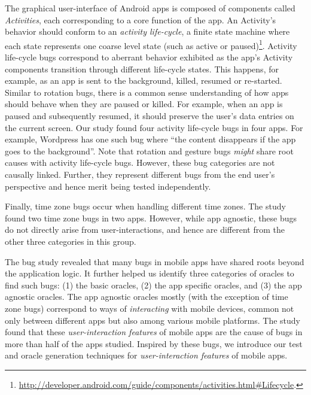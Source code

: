 The graphical user-interface of Android apps is composed of components called \textit{Activities}, each corresponding to a core function of the app. An Activity's behavior should conform to an \textit{activity life-cycle}, a finite state machine where each state represents one coarse level state (such as active or paused)\footnote{\url{http://developer.android.com/guide/components/activities.html#Lifecycle}.}. 
Activity life-cycle bugs correspond to aberrant behavior exhibited as the app's Activity components transition through different life-cycle states.
This happens, for example, as an app is sent to the background, killed, resumed or re-started. Similar to rotation bugs, there is a common sense understanding of how apps should behave when they are paused or killed. %
For example, when an app is paused and subsequently resumed, it should preserve the user's data entries on the current screen. Our study found four activity life-cycle bugs in four apps. For example, Wordpress has one such bug where ``the content disappears if the app goes to the background''. Note that rotation and gesture bugs \textit{might} share root causes with activity life-cycle bugs. However, these bug categories are not causally linked. Further, they represent different bugs from the end user's perspective and hence merit being tested independently.

Finally, time zone bugs occur when handling different time zones. The study found two time zone bugs in two apps. However, while app agnostic, these bugs do not directly arise from user-interactions, and hence are different from the other three categories in this group.


The bug study revealed that many bugs in mobile apps have shared roots beyond the application logic. It further helped us identify three categories of oracles to find such bugs: (1) the basic oracles,
(2) the app specific oracles,
and (3) the app agnostic oracles. The app agnostic oracles mostly (with the exception of time zone bugs) correspond to ways of \emph{interacting} with mobile devices, common not only between different apps but also among various mobile platforms. The study found that these \emph{user-interaction features} of mobile apps are the cause of bugs in more than half of the apps studied.  Inspired by these bugs, we introduce our test and oracle generation techniques for \emph{user-interaction features} of mobile apps.
